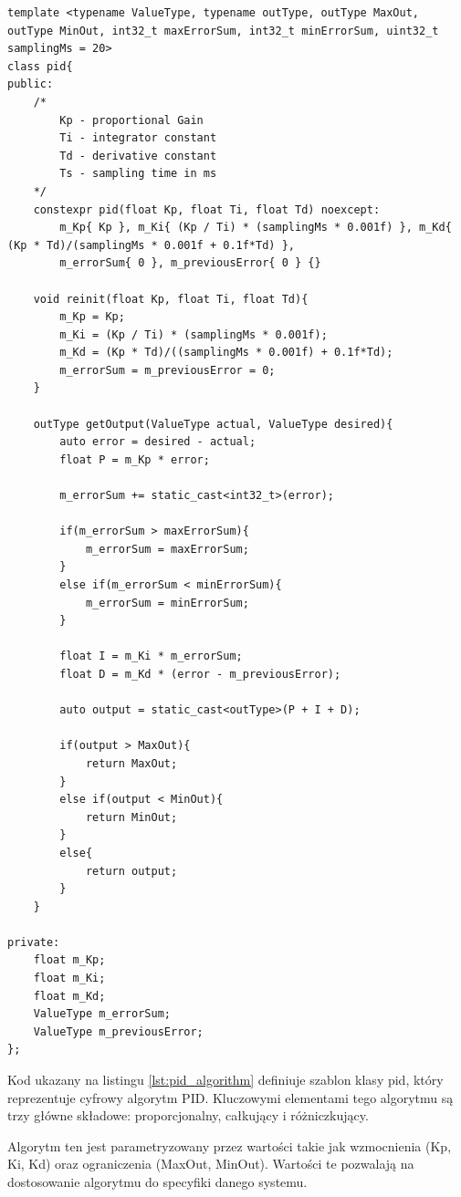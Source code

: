 \documentclass[12pt,twoside]{article}
\begin{document}
\begin{lstlisting}[caption={Kod implementacji cyfrowego algorytmu PID}, label={lst:pid_algorithm}]
template <typename ValueType, typename outType, outType MaxOut, outType MinOut, int32_t maxErrorSum, int32_t minErrorSum, uint32_t samplingMs = 20>
class pid{
public:
    /*
        Kp - proportional Gain
        Ti - integrator constant
        Td - derivative constant
        Ts - sampling time in ms
    */
    constexpr pid(float Kp, float Ti, float Td) noexcept:
        m_Kp{ Kp }, m_Ki{ (Kp / Ti) * (samplingMs * 0.001f) }, m_Kd{ (Kp * Td)/(samplingMs * 0.001f + 0.1f*Td) },
        m_errorSum{ 0 }, m_previousError{ 0 } {}
    
    void reinit(float Kp, float Ti, float Td){
        m_Kp = Kp;
        m_Ki = (Kp / Ti) * (samplingMs * 0.001f);
        m_Kd = (Kp * Td)/((samplingMs * 0.001f) + 0.1f*Td);
        m_errorSum = m_previousError = 0;
    }

    outType getOutput(ValueType actual, ValueType desired){
        auto error = desired - actual;
        float P = m_Kp * error;
        
        m_errorSum += static_cast<int32_t>(error);

        if(m_errorSum > maxErrorSum){
            m_errorSum = maxErrorSum;
        }
        else if(m_errorSum < minErrorSum){
            m_errorSum = minErrorSum; 
        }

        float I = m_Ki * m_errorSum;
        float D = m_Kd * (error - m_previousError);

        auto output = static_cast<outType>(P + I + D);

        if(output > MaxOut){
            return MaxOut;
        }
        else if(output < MinOut){
            return MinOut;
        }
        else{
            return output;
        }
    }

private:
    float m_Kp;
    float m_Ki;
    float m_Kd;
    ValueType m_errorSum;
    ValueType m_previousError;
};
\end{lstlisting}

Kod ukazany na listingu \ref{lst:pid_algorithm} definiuje szablon klasy pid, który reprezentuje cyfrowy algorytm PID. Kluczowymi elementami tego algorytmu są trzy główne składowe: proporcjonalny, całkujący i różniczkujący.

Algorytm ten jest parametryzowany przez wartości takie jak wzmocnienia (Kp, Ki, Kd) oraz ograniczenia (MaxOut, MinOut). Wartości te pozwalają na dostosowanie algorytmu do specyfiki danego systemu.
\end{document}
